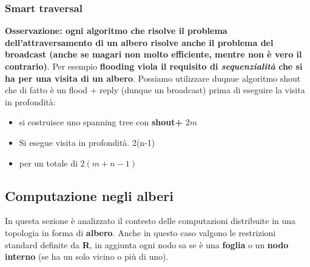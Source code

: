 \documentclass[12pt]{article}
\begin{document}
		\subsubsection{Smart traversal}
			\textbf{Osservazione: ogni algoritmo che risolve il problema dell'attraversamento di un albero risolve anche il problema del broadcast (anche se magari non molto efficiente, mentre non è vero il contrario)}. Per esempio \textbf{flooding viola il requisito di \textit{sequenzialità} che si ha per una visita di un albero}. 
			Possiamo utilizzare duqnue  algoritmo shout che di fatto è un flood + reply (dunque un broadcast) prima di eseguire la visita in profondità:
			\begin{itemize}
				\item si costruisce uno spanning tree con \textbf{shout+ }  $2m$
				\item Si esegue visita in profondità. 2(n-1)
				\item per un totale di $2(m+n-1)$
			\end{itemize}
			
\subsection{Computazione negli alberi}		
	In questa sezione è analizzato il contesto delle computazioni distribuite in una topologia in forma di \textbf{albero}. Anche in questo caso valgono le restrizioni standard definite da \textbf{R}, in aggiunta ogni nodo sa se è una \textbf{foglia} o un \textbf{nodo interno} (se ha un solo vicino o più di uno).
	
\end{document}
